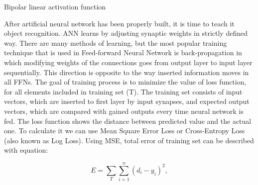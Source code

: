 \documentclass[conference]{IEEEtran}
\begin{document}
\vspace{20pt}	
\begin{center}
\newline Bipolar linear activation function
\end{center}
\vspace{20pt}

After artificial neural network has been properly built, it is time to teach it object recognition. ANN learns by adjusting synaptic weights in strictly defined way. There are many methods of learning, but the most popular training technique that is used in Feed-forward Neural Network is back-propagation in which modifying weights of the connections goes from output layer to input layer sequentially. This direction is opposite to the way inserted information moves in all FFNs. The goal of training process is to minimize the value of loss function, for all elements included in training set (T). The training set consists of input vectors, which are inserted to first layer by input synapses, and expected output vectors, which are compared with gained outputs every time neural network is fed. The loss function shows the distance between predicted value and the actual one. To calculate it we can use Mean Square Error Loss or Cross-Entropy Loss (also known as Log Loss). Using MSE, total error of training set can be described with equation:

    \begin{equation*}
        E = \sum_{T}\sum_{i=1}^{n}(d_{i} - y_{i})^{2},
    \end{equation*}
\end{document}
